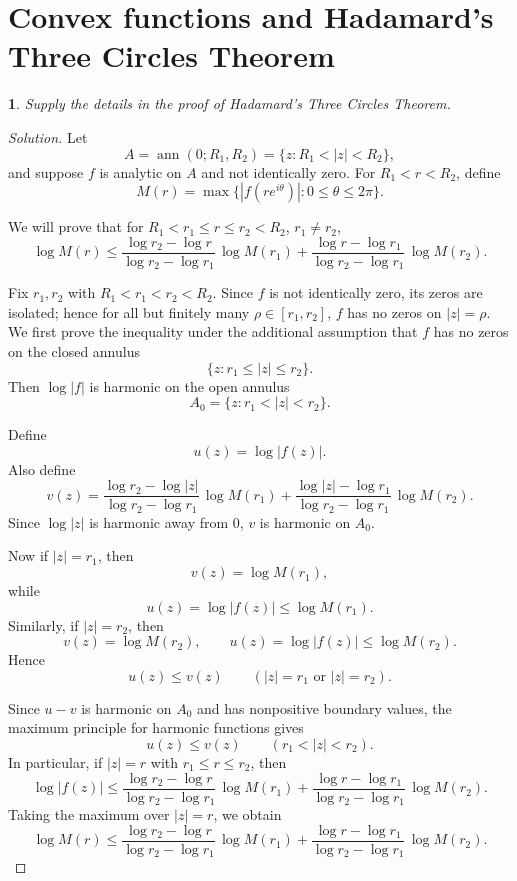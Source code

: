 \documentclass[12pt, a4paper]{report}
\theoremstyle{spaced}
\newtheorem{exercise}{}
\newcommand{\setexercise}[1]{\setcounter{exercise}{#1-1}}
\begin{document}
\section{Convex functions and Hadamard's Three Circles Theorem}
\setexercise{4}
\begin{exercise}
	Supply the details in the proof of Hadamard's Three Circles Theorem.
\end{exercise}
\begin{proof}[Solution]
	Let
	\[
		A=\operatorname{ann}(0;R_1,R_2)=\{z:R_1<|z|<R_2\},
	\]
	and suppose \(f\) is analytic on \(A\) and not identically zero. For \(R_1<r<R_2\), define
	\[
		M(r)=\max\{|f(re^{i\theta})|:0\le \theta\le 2\pi\}.
	\]

	We will prove that for \(R_1<r_1\le r\le r_2<R_2\), \(r_1\ne r_2\),
	\[
		\log M(r)\le
		\frac{\log r_2-\log r}{\log r_2-\log r_1}\,\log M(r_1)
		+
		\frac{\log r-\log r_1}{\log r_2-\log r_1}\,\log M(r_2).
	\]

	\medskip
	Fix \(r_1,r_2\) with \(R_1<r_1<r_2<R_2\). Since \(f\) is not identically zero, its zeros are isolated; hence for all but finitely many \(\rho\in[r_1,r_2]\), \(f\) has no zeros on \(|z|=\rho\). We first prove the inequality under the additional assumption that \(f\) has no zeros on the closed annulus
	\[
		\{z:r_1\le |z|\le r_2\}.
	\]
	Then \(\log|f|\) is harmonic on the open annulus
	\[
		A_0=\{z:r_1<|z|<r_2\}.
	\]

	Define
	\[
		u(z)=\log|f(z)|.
	\]
	Also define
	\[
		v(z)=
		\frac{\log r_2-\log|z|}{\log r_2-\log r_1}\,\log M(r_1)
		+
		\frac{\log|z|-\log r_1}{\log r_2-\log r_1}\,\log M(r_2).
	\]
	Since \(\log|z|\) is harmonic away from \(0\), \(v\) is harmonic on \(A_0\).

	Now if \(|z|=r_1\), then
	\[
		v(z)=\log M(r_1),
	\]
	while
	\[
		u(z)=\log|f(z)|\le \log M(r_1).
	\]
	Similarly, if \(|z|=r_2\), then
	\[
		v(z)=\log M(r_2),
		\qquad
		u(z)=\log|f(z)|\le \log M(r_2).
	\]
	Hence
	\[
		u(z)\le v(z)
		\qquad (|z|=r_1 \text{ or } |z|=r_2).
	\]

	Since \(u-v\) is harmonic on \(A_0\) and has nonpositive boundary values, the maximum principle for harmonic functions gives
	\[
		u(z)\le v(z)\qquad (r_1<|z|<r_2).
	\]
	In particular, if \(|z|=r\) with \(r_1\le r\le r_2\), then
	\[
		\log|f(z)|\le
		\frac{\log r_2-\log r}{\log r_2-\log r_1}\,\log M(r_1)
		+
		\frac{\log r-\log r_1}{\log r_2-\log r_1}\,\log M(r_2).
	\]
	Taking the maximum over \(|z|=r\), we obtain
	\[
		\log M(r)\le
		\frac{\log r_2-\log r}{\log r_2-\log r_1}\,\log M(r_1)
		+
		\frac{\log r-\log r_1}{\log r_2-\log r_1}\,\log M(r_2).
	\]


\end{proof}
\end{document}
